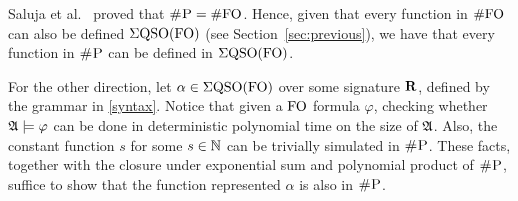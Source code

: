 Saluja et al.~\cite{SalujaST95} proved that $\text{\sc \#P} = \#{\rm FO}$. Hence, given that every function in $\#{\rm FO}$ can also be defined $\Sigma{\rm QSO}({\rm FO})$ (see Section~\ref{sec:previous}), we have that every function in $\text{\sc \#P}$ can be defined in $\Sigma{\rm QSO}({\rm FO})$.

For the other direction, let $\alpha\in\Sigma{\rm QSO}({\rm FO})$ over some signature $\mathbf{R}$, defined by the grammar in \ref{syntax}. Notice that given a ${\rm FO}$ formula $\varphi$, checking whether $\mathfrak{A}\models\varphi$ can be done in deterministic polynomial time on the size of $\mathfrak{A}$. Also, the constant function $s$ for some $s\in\mathbb{N}$ can be trivially simulated in $\text{\sc \#P}$. These facts, together with the closure under exponential sum and polynomial product of $\text{\sc \#P}$\cite{F97}, suffice to show that the function represented $\alpha$ is also in $\text{\sc \#P}$.

